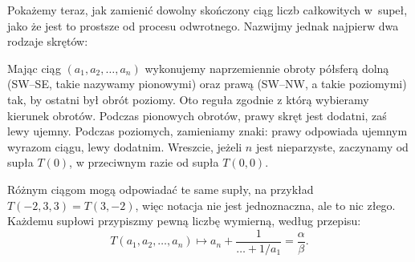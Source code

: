 Pokażemy teraz, jak zamienić dowolny skończony ciąg liczb całkowitych w~supeł, jako że jest to prostsze od procesu odwrotnego.
Nazwijmy jednak najpierw dwa rodzaje skrętów:
\begin{comment}
\[
    \begin{tikzpicture}[baseline=-0.65ex, scale=0.1]
    \useasboundingbox (-10, -10) rectangle (10, 5);
    \begin{knot}[clip width=5, end tolerance=1pt, flip crossing/.list={2}]
        \strand[semithick] (-10, -5) [out=right, in=left] to (0, 5) to (10, -5);
        \strand[semithick] (-10, 5) [out=right, in=left] to (0, -5);
        \strand[semithick] (0, -5) [out=right, in=left] to (10, 5);
        \node at (0, -9) {prawy skręt};
    \end{knot}
    \end{tikzpicture}
    \quad\quad\quad
    \begin{tikzpicture}[baseline=-0.65ex, scale=0.1]
    \useasboundingbox (-10, -10) rectangle (10, 5);
    \begin{knot}[clip width=5, end tolerance=1pt, flip crossing/.list={1}]
        \strand[semithick] (-10, -5) [out=right, in=left] to (0, 5) to (10, -5);
        \strand[semithick] (-10, 5) [out=right, in=left] to (0, -5);
        \strand[semithick] (0, -5) [out=right, in=left] to (10, 5);
        \node at (0, -9) {lewy skręt};
    \end{knot}
    \end{tikzpicture}
\]
\end{comment}

Mając ciąg $(a_1, a_2, \ldots, a_n)$ wykonujemy naprzemiennie obroty półsferą dolną (SW--SE, takie nazywamy pionowymi) oraz prawą (SW--NW, a takie poziomymi) tak, by ostatni był obrót poziomy.
Oto reguła zgodnie z którą wybieramy kierunek obrotów.
Podczas pionowych obrotów, prawy skręt jest dodatni, zaś lewy ujemny.
Podczas poziomych, zamieniamy znaki: prawy odpowiada ujemnym wyrazom ciągu, lewy dodatnim.
Wreszcie, jeżeli $n$ jest nieparzyste, zaczynamy od supła $T(0)$, w przeciwnym razie od supła $T(0, 0)$.

Różnym ciągom mogą odpowiadać te same supły, na przykład $T(-2, 3, 3) = T(3, -2)$, więc notacja nie jest jednoznaczna, ale to nic złego.
Każdemu supłowi przypiszmy pewną liczbę wymierną, według przepisu:
\begin{equation}
    T(a_1, a_2, \ldots, a_n) \mapsto a_n + \frac{1}{\ldots + 1/a_1} = \frac \alpha \beta.
\end{equation}

